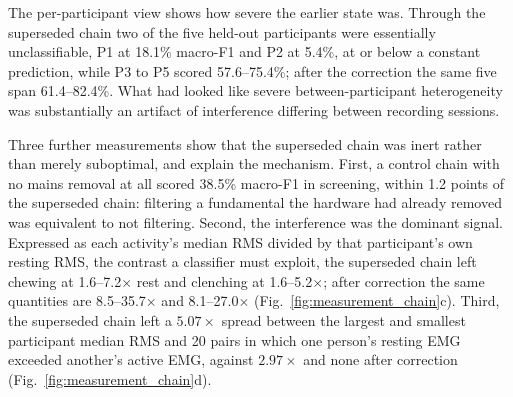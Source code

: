 \documentclass[pdflatex,sn-nature,iicol]{sn-jnl}
\begin{document}
The per-participant view shows how severe the earlier state was. Through the superseded chain two of the five held-out participants were essentially unclassifiable, P1 at 18.1\% macro-F1 and P2 at 5.4\%, at or below a constant prediction, while P3 to P5 scored 57.6--75.4\%; after the correction the same five span 61.4--82.4\%. What had looked like severe between-participant heterogeneity was substantially an artifact of interference differing between recording sessions.

Three further measurements show that the superseded chain was inert rather than merely suboptimal, and explain the mechanism. First, a control chain with no mains removal at all scored 38.5\% macro-F1 in screening, within 1.2 points of the superseded chain: filtering a fundamental the hardware had already removed was equivalent to not filtering. Second, the interference was the dominant signal. Expressed as each activity's median RMS divided by that participant's own resting RMS, the contrast a classifier must exploit, the superseded chain left chewing at 1.6--7.2$\times$ rest and clenching at 1.6--5.2$\times$; after correction the same quantities are 8.5--35.7$\times$ and 8.1--27.0$\times$ (Fig.~\ref{fig:measurement_chain}c). Third, the superseded chain left a $5.07\times$ spread between the largest and smallest participant median RMS and 20 pairs in which one person's resting EMG exceeded another's active EMG, against $2.97\times$ and none after correction (Fig.~\ref{fig:measurement_chain}d).
\end{document}
